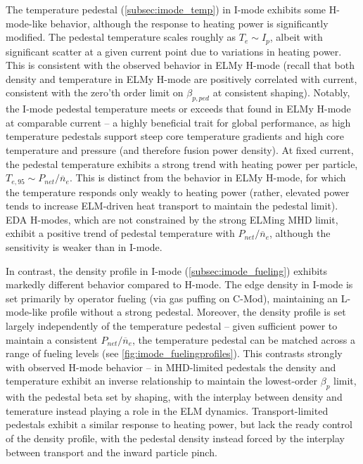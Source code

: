 The temperature pedestal (\cref{subsec:imode_temp}) in I-mode exhibits some H-mode-like behavior, although the response to heating power is significantly modified.  The pedestal temperature scales roughly as $T_e \sim I_p$, albeit with significant scatter at a given current point due to variations in heating power.  This is consistent with the observed behavior in ELMy H-mode (recall that both density and temperature in ELMy H-mode are positively correlated with current, consistent with the zero'th order limit on $\beta_{p,ped}$ at consistent shaping).  Notably, the I-mode pedestal temperature meets or exceeds that found in ELMy H-mode at comparable current -- a highly beneficial trait for global performance, as high temperature pedestals support steep core temperature gradients and high core temperature and pressure (and therefore fusion power density).  At fixed current, the pedestal temperature exhibits a strong trend with heating power per particle, $T_{e,95} \sim P_{net}/\overline{n}_e$.  This is distinct from the behavior in ELMy H-mode, for which the temperature responds only weakly to heating power (rather, elevated power tends to increase ELM-driven heat transport to maintain the pedestal limit).  EDA H-modes, which are not constrained by the strong ELMing MHD limit, exhibit a positive trend of pedestal temperature with $P_{net}/\overline{n}_e$, although the sensitivity is weaker than in I-mode.

In contrast, the density profile in I-mode (\cref{subsec:imode_fueling}) exhibits markedly different behavior compared to H-mode.  The edge density in I-mode is set primarily by operator fueling (via gas puffing on C-Mod), maintaining an L-mode-like profile without a strong pedestal.  Moreover, the density profile is set largely independently of the temperature pedestal -- given sufficient power to maintain a consistent $P_{net}/\overline{n}_e$, the temperature pedestal can be matched across a range of fueling levels (see \cref{fig:imode_fuelingprofiles}).  This contrasts strongly with observed H-mode behavior -- in MHD-limited pedestals the density and temperature exhibit an inverse relationship to maintain the lowest-order $\beta_p$ limit, with the pedestal beta set by shaping, with the interplay between density and temerature instead playing a role in the ELM dynamics.  Transport-limited pedestals exhibit a similar response to heating power, but lack the ready control of the density profile, with the pedestal density instead forced by the interplay between transport and the inward particle pinch.

